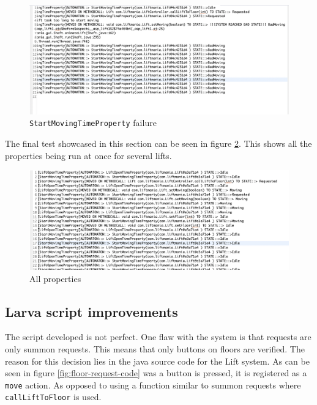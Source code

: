 \documentclass[a4paper, 12pt]{article}
\begin{document}
\begin{figure}[h]
   \centering
   \includegraphics[width=\textwidth,height=\textheight,keepaspectratio]{images/start-moving-time-property-failed} %
   \caption{\texttt{StartMovingTimeProperty} failure}
   \label{fig:start-moving-time-property-failed}
\end{figure}

The final test showcased in this section can be seen in figure \ref{fig:all-properties}. This shows all the properties being run at once for several lifts. 

\begin{figure}[h]
   \centering
   \includegraphics[width=\textwidth,height=\textheight,keepaspectratio]{images/all-properties} %
   \caption{All properties}
   \label{fig:all-properties}
\end{figure}

\subsection{Larva script improvements}
The script developed is not perfect. One flaw with the system is that requests are only summon requests. This means that only buttons on floors are verified. The reason for this decision lies in the java source code for the Lift system. As can be seen in figure \ref{fig:floor-request-code} was a button is pressed, it is registered as a \texttt{move} action. As opposed to using a function similar to summon requests where \texttt{callLiftToFloor} is used. \\
\end{document}
